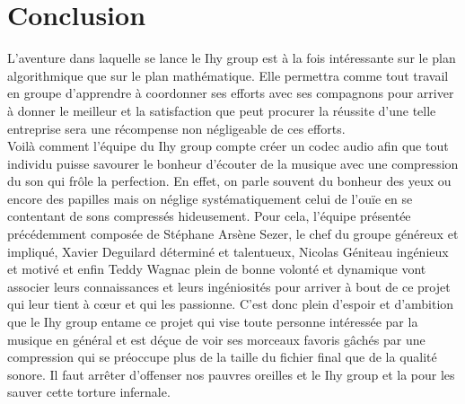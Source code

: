 \documentclass[a4paper,12pt]{article}
\begin{document}
\newpage

\section*{Conclusion}
L'aventure  dans  laquelle  se  lance  le   Ihy  group  est  à  la  fois
intéressante sur  le plan  algorithmique que  sur le  plan mathématique.
Elle permettra comme tout travail en groupe d'apprendre à coordonner ses
efforts avec  ses compagnons  pour arriver  à donner  le meilleur  et la
satisfaction que peut  procurer la réussite d'une  telle entreprise sera
une récompense non négligeable de ces efforts.\\
Voilà comment l'équipe du Ihy group compte créer un codec audio afin que
tout individu  puisse savourer le  bonheur d'écouter de  la musique avec
une compression  du son  qui frôle  la perfection.  En  effet,  on parle
souvent du bonheur  des  yeux  ou  encore  des  papilles mais on néglige
systématiquement celui  de l'ouïe  en se  contentant de  sons compressés
hideusement.  Pour cela,  l'équipe  présentée  précédemment  composée de
Stéphane Arsène Sezer,  le chef  du groupe généreux et impliqué,  Xavier
Deguilard déterminé et talentueux,  Nicolas Géniteau ingénieux et motivé
et enfin Teddy Wagnac plein de  bonne volonté et dynamique vont associer
leurs  connaissances et  leurs ingéniosités  pour arriver  à bout  de ce
projet qui  leur tient à cœur  et qui  les passionne.  C'est  donc plein
d'espoir et d'ambition que le Ihy  group entame ce projet qui vise toute
personne intéressée par  la musique en général et est  déçue de voir ses
morceaux favoris gâchés par une compression  qui se préoccupe plus de la
taille du fichier  final  que  de  la  qualité  sonore.  Il faut arrêter
d'offenser nos  pauvres oreilles et le  Ihy group et la  pour les sauver
cette torture infernale.
\end{document}
